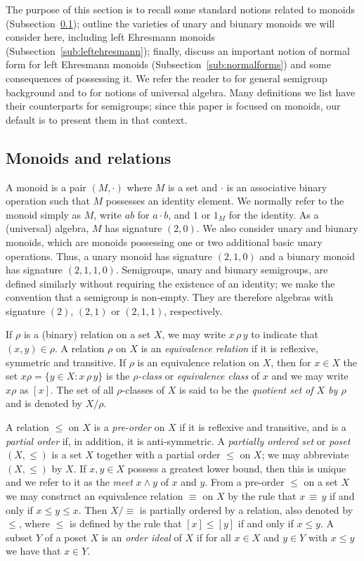 \documentclass[12pt]{amsart}
\theoremstyle{definition}
\theoremstyle{definition}
\numberwithin{them}{section}
\numberwithin{equation}{section}
\begin{document}
The purpose of this section is to recall some standard notions related to monoids (Subsection~\ref{sub:monoids}); outline the varieties of unary and biunary monoids we will consider here, including left Ehresmann monoids (Subsection~\ref{sub:leftehresmann}); finally, discuss an important  notion of normal form for left Ehresmann monoids (Subsection~\ref{sub:normalforms}) and some consequences of possessing it.  
We refer the reader to \cite{H} for general semigroup background and to \cite{MMT:1987} for notions of universal algebra.  Many definitions we list have their counterparts for semigroups; since this paper is focused on monoids,  our default is to  present them in that context.

\subsection{Monoids and relations}\label{sub:monoids}

A monoid is a pair $(M,\cdot)$ where $M$ is a set and $\cdot$ is an associative binary operation such that $M$ possesses an identity element. We normally refer to the monoid simply as $M$, write $ab$ for $a\cdot b$, and $1$ or $1_M$ for the identity. As a (universal)  algebra, $M$ has signature $(2,0)$. We also consider unary and biunary monoids, which are monoids possessing one or two additional basic unary operations. Thus, a unary monoid has signature $(2,1,0)$ and a biunary monoid has signature $(2,1,1,0)$. Semigroups, unary and biunary semigroups, are defined similarly without requiring the existence of an identity;  we make the convention that a semigroup is non-empty. They are therefore algebras with signature $(2)$, $(2,1)$ or $(2,1,1)$, respectively. 

If $\rho$ is a (binary) relation on a set $X$, we  may write $x\, \rho\,
y$ to indicate that $(x, y) \in \rho$.    A relation $\rho$ on $X$ is an {\it equivalence relation} if it is reflexive, symmetric and transitive. If $\rho$ is an equivalence relation on $X$, then for $x\in X$ the set  $x\rho=\{ y\in X:x\,\rho\, y\}$ is the {\it $\rho$-class} or {\it equivalence class} of $x$ and we may write $x\rho$ as $[x]$. The set of all $\rho$-classes of $X$ is said to be the {\it quotient set of $X$ by $\rho$} and is denoted by $X/\rho$.

 A relation $\leq$ on $X$ is a {\it pre-order} on $X$ if it is reflexive and transitive, and  is a {\it partial order} if, in addition, it is anti-symmetric. A {\it partially ordered set} 
 or {\em poset} $(X, \leq)$ is a set $X$ together with a partial order $\leq$ on $X$; 
 we may abbreviate $(X,\leq)$ by $X$. If $x,y\in X$ possess a greatest lower bound, then this is unique and we refer to it as the {\em meet}
 $x\wedge y$ of $x$ and $y$. From a pre-order $\leq$ on a set $X$ we may construct an equivalence relation $\equiv$ on $X$ by the rule that $x\,\equiv\, y$ if and only if $x\leq y\leq x$. Then $X/\equiv$ is partially ordered by a relation, also denoted by $\leq$, where $\leq$ is defined by the rule that $[x]\leq [y]$ if and only if $x\leq y$. A subset $Y$ of a poset $X$  is an {\it order ideal} of $X$ if for all $x \in X$ and $y \in Y$  with $x \leq y$  we have that $x \in Y$.
\end{document}
